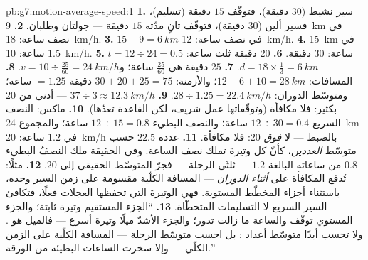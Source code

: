 \begin{solution}{pb:g7:motion-average-speed:1}
\textbf{1.} سير نشيط ($30$ دقيقة)، فتوقّف $15$ دقيقة (تسليم)،
فسير ألين ($30$ دقيقة)، فتوقّف ثانٍ مدّته $15$ دقيقة --- جولتان
وطلبان.
\textbf{2.} \qty{9}{km} في نصف ساعة: \qty{18}{km/h}.
\textbf{3.} $15 - 9 = \qty{6}{km}$ في نصف ساعة:
\qty{12}{km/h}.
\textbf{4.} \qty{15}{km} في $1.5$ ساعة: \qty{10}{km/h}.
\textbf{5.} $t = 12 \div 24 = 0.5$ ساعة: $30$ دقيقة.
\textbf{6.} $20$ دقيقة ثلث ساعة: $d = 18 \times \tfrac{1}{3} =
\qty{6}{km}$.
\textbf{7.} $25$ دقيقة هي $\tfrac{25}{60}$ ساعة؛ و$v = 10
\div \tfrac{25}{60} = \qty{24}{km/h}$.
\textbf{8.} المسافات: $12 + 6 + 10 = \qty{28}{km}$؛ والأزمنة:
$30 + 20 + 25 = 75$ دقيقة $= 1.25$ ساعة؛ ومتوسّط الدوران:
$28 \div 1.25 = \qty{22.4}{km/h}$.
\textbf{9.} $37 \div 3 \approx \qty{12.3}{km/h}$ --- أدنى من
$20$ بكثير: فلا مكافأة (وتوقّفاتها عمل شريف، لكن القاعدة
تعدّها).
\textbf{10.} ماكس: النصف السريع $12 \div 30 = 0.4$ ساعة؛
والنصف البطيء $12 \div 15 = 0.8$ ساعة؛ والمجموع \qty{24}{km} في
$1.2$ ساعة: \qty{20}{km/h} بالضبط --- لا \emph{فوق} $20$: فلا
مكافأة.
\textbf{11.} عدده $22.5$ حسب متوسّط \emph{العددين}، كأنّ كل
وتيرة تملك نصف الساعة. وفي الحقيقة ملك النصفُ البطيء $0.8$ من
ساعاته البالغة $1.2$ --- ثلثَي  الرحلة --- فجرّ المتوسّط
الحقيقي إلى $20$.
\textbf{12.} مثلًا: تُدفع المكافأة على 
\emph{أثناء الدوران} --- المسافة الكلّية مقسومة على زمن السير
وحده، باستثناء أجزاء المخطّط المستوية. فهي  الوتيرة التي
تحفظها العجلات فعلًا، فتكافئ السير السريع لا التسليمات
المتخطّاة.
\textbf{13.} ``الجزء المستقيم وتيرة ثابتة؛ والجزء المستوي
توقّف والساعة ما زالت تدور؛ والجزء الأشدّ ميلًا وتيرة أسرع ---
فالميل هو . ولا تحسب أبدًا متوسّط أعداد : بل احسب
متوسّط الرحلة --- المسافة الكلّية على الزمن الكلّي --- وإلا
سخرت الساعات البطيئة من الورقة.''
\end{solution}
